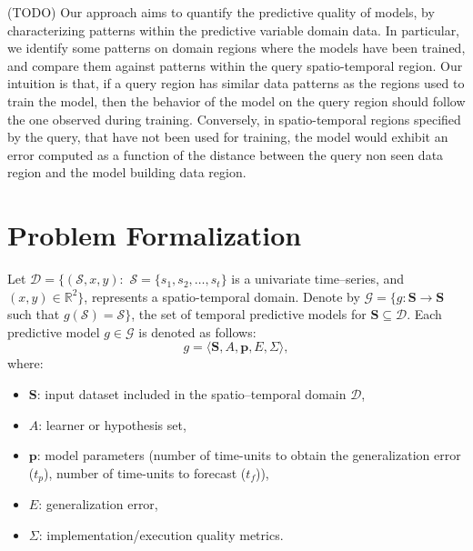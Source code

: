 (TODO) Our approach aims to quantify the predictive quality of models, by characterizing patterns within the predictive variable domain data. In particular, we identify some patterns on domain regions where the models have been trained, and compare them against patterns within the query spatio-temporal region. Our intuition is that, if a query region has similar data patterns as the regions used to train the model, then the behavior of the model on the query region should follow the one observed during training.
Conversely, in spatio-temporal regions specified by the query, that have not been used for training, the model would exhibit an error computed as a function of the distance between the query non seen data region and the model building data region.


\section{Problem Formalization}
\label{Sec:ProblemFormalization}

Let $\mathcal{D} = \{(\mathcal{S}, x, y): \,\, \mathcal{S} = \{s_{1}, s_{2}, \ldots, s_{t}\}$ is a univariate time--series, and $(x,y) \in \mathbb{R}^{2}\}$, represents a spatio-temporal domain. Denote by $\mathcal{G} = \{g: \mathbf{S} \to \mathbf{S}$ such that $g(\mathcal{S}) = \mathcal{S}\}$, the set of temporal predictive models for $\mathbf{S} \subseteq \mathcal{D}$. Each predictive model $g\in \mathcal{G}$ is denoted as follows:
\begin{equation}
\label{eq:ModelDefinition}
g = \langle \mathbf{S}, A, \mathbf{p}, E, \varSigma \rangle,
\end{equation}
where:
\begin{itemize}[noitemsep,nolistsep]	
	\item $\mathbf{S}$: input dataset included in the spatio--temporal domain $\mathcal{D}$,
	\item $A$: learner or hypothesis set,
	\item $\mathbf{p}$: model parameters (number of time-units to obtain the generalization error ($t_{p}$), number of time-units to forecast ($t_{f}$)),
	\item $E$: generalization error,
	\item $\varSigma$: implementation/execution quality metrics.
\end{itemize}

